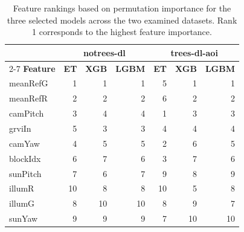 \begin{table}[htb]
\centering
\begin{tabular}{|l||r|r|r||r|r|r|}
\hline
& \multicolumn{3}{c||}{\textbf{notrees-dl}}
& \multicolumn{3}{c|}{\textbf{trees-dl-aoi}} \\
\cline{2-7}
\textbf{Feature} & \textbf{ET} & \textbf{XGB} & \textbf{LGBM}
                 & \textbf{ET} & \textbf{XGB} & \textbf{LGBM} \\
\hline\hline
meanRefG & 1  & 1  & 1  & 5  & 1  & 1  \\
\hline
meanRefR & 2  & 2  & 2  & 6  & 2  & 2  \\
\hline
camPitch & 3  & 4  & 4  & 1  & 3  & 3  \\
\hline
grviIn   & 5  & 3  & 3  & 4  & 4  & 4  \\
\hline
camYaw   & 4  & 5  & 5  & 2  & 6  & 5  \\
\hline
blockIdx & 6  & 7  & 6  & 3  & 7  & 6  \\
\hline
sunPitch & 7  & 6  & 7  & 9  & 8  & 9  \\
\hline
illumR   & 10 & 8  & 8  & 10 & 5  & 8  \\
\hline
illumG   & 8  & 10 & 10 & 8  & 9  & 7  \\
\hline
sunYaw   & 9  & 9  & 9  & 7  & 10 & 10 \\
\hline
\end{tabular}
\caption{Feature rankings based on permutation importance for the three
selected models across the two examined datasets. Rank 1 corresponds
to the highest feature importance.}
\label{permutation-importance-rankings}
\end{table}


